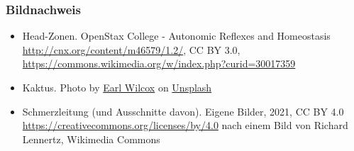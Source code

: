 \documentclass{beamer}
\begin{document}
\begin{frame}
 
\frametitle{Bildnachweis}
 
\begin{tiny}
  

\begin{itemize}
\item
Head-Zonen. OpenStax College - Autonomic Reflexes and Homeostasis  \url{http://cnx.org/content/m46579/1.2/}, CC BY 3.0, \url{https://commons.wikimedia.org/w/index.php?curid=30017359}
\item
Kaktus. Photo by \href{https://unsplash.com/@earl_plannerzone?utm_source=unsplash&utm_medium=referral&utm_content=creditCopyText}{Earl Wilcox} on \href{https://unsplash.com/s/photos/pain?utm_source=unsplash&utm_medium=referral&utm_content=creditCopyText}{Unsplash}
\item
Schmerzleitung (und Ausschnitte davon). Eigene Bilder, 2021, CC BY 4.0 \url{https://creativecommons.org/licenses/by/4.0} nach einem Bild von Richard Lennertz,  Wikimedia Commons
\end{itemize}

\end{tiny}

\end{frame}
\end{document}
